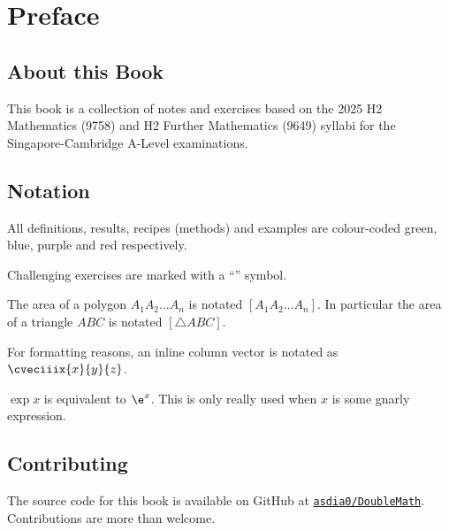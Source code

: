 \chapter*{Preface}

\section*{About this Book}

This book is a collection of notes and exercises based on the 2025 H2 Mathematics (9758) and H2 Further Mathematics (9649) syllabi for the Singapore-Cambridge A-Level examinations.

\section*{Notation}

All definitions, results, recipes (methods) and examples are colour-coded green, blue, purple and red respectively. 

Challenging exercises are marked with a ``\chili'' symbol.

The area of a polygon $A_1 A_2 \dots A_n$ is notated $[A_1 A_2 \dots A_n]$. In particular the area of a triangle $ABC$ is notated $[\triangle ABC]$.

For formatting reasons, an inline column vector is notated as $\cveciiix{x}{y}{z}$.

$\exp x$ is equivalent to $\e^{x}$. This is only really used when $x$ is some gnarly expression.

\section*{Contributing}

The source code for this book is available on GitHub at \href{https://github.com/asdia0/DoubleMath}{\texttt{asdia0/DoubleMath}}. Contributions are more than welcome.